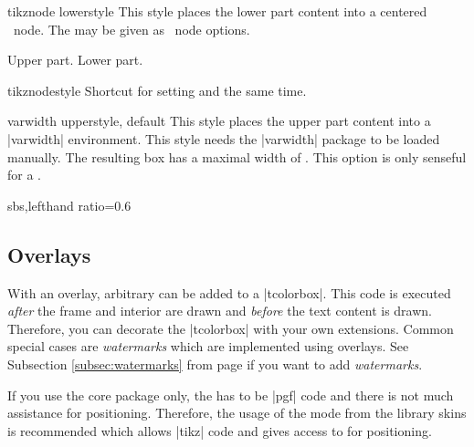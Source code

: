 \begin{docTcbKey}{tikznode lower}{}{style}
  This style places the lower part content into a centered
  \tikzname\ node. The  may be given as \tikzname\  node options.
\begin{dispExample}
\begin{tcolorbox}[bicolor,colback=LightBlue!50!white,colbacklower=white,
  colframe=black,tikznode lower={inner sep=2pt,draw=red,fill=yellow}]
Upper part.
\tcblower
Lower part.
\end{tcolorbox}
\end{dispExample}
\end{docTcbKey}

\begin{docTcbKey}{tikznode}{}{style}
  Shortcut for setting  and 
  the same time.
\end{docTcbKey}


\begin{docTcbKey}{varwidth upper}{}{style, default }
  This style places the upper part content into a |varwidth| environment.
  This style needs the |varwidth| package \cite{arseneau:2011a} to be loaded manually.
  The resulting box has a maximal width of .
  This option is only senseful for a .
\begin{dispExample*}{sbs,lefthand ratio=0.6}

\end{dispExample*}
\end{docTcbKey}


\clearpage
\subsection{Overlays}\label{subsec:overlays}
With an overlay, arbitrary  can be added to a
|tcolorbox|. This code is executed \emph{after} the frame and interior are
drawn and \emph{before} the text content is drawn. Therefore, you can
decorate the |tcolorbox| with your own extensions.
Common special cases are \emph{watermarks} which are implemented using overlays.
See Subsection \ref{subsec:watermarks} from page \pageref{subsec:watermarks} if
you want to add \emph{watermarks}.
\begin{marker}
If you use the core package only, the  has to be |pgf| code
and there is not much assistance for positioning.
Therefore, the usage of the  mode from the library skins
is recommended which allows |tikz| code and gives access to
 for positioning.
\end{marker}

